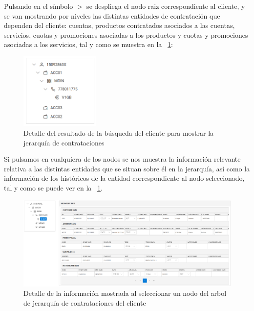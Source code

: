 Pulsando en el símbolo \large{$>$} se despliega el nodo raiz correspondiente al cliente, y se van mostrando por niveles las distintas entidades de contratación que dependen del cliente: cuentas, productos contratados asociados a las cuentas, servicios, cuotas y promociones asociadas a los productos y cuotas y promociones asociadas a los servicios,  tal y como se muestra en la \figurename~\ref{fig:vista-jerarquia-desplegada}:


\begin{figure}[H]
  \centering
  \includegraphics[width=0.35\textwidth]{imaxes/vista-jerarquia-desplegada.png}
  \caption{Detalle del resultado de la búsqueda del cliente para mostrar la jerarquía de contrataciones}
  \label{fig:vista-jerarquia-desplegada}
\end{figure}


Si pulsamos en cualquiera de los nodos se nos muestra la información relevante relativa a las distintas entidades que se situan sobre él en la jerarquía, así como la información de los históricos de la entidad correspondiente al nodo seleccionado, tal y como se puede ver en la \figurename~\ref{fig:vista-jerarquia-desplegada}.

\begin{figure}
  \centering
  \includegraphics[width=\textwidth]{imaxes/vista-jearquia-informacion-nodo.png}
  \caption{Detalle de la información mostrada al seleccionar un nodo del arbol de jerarquía de contrataciones del cliente}
  \label{fig:vista-jearquia-informacion-nodo}
\end{figure}